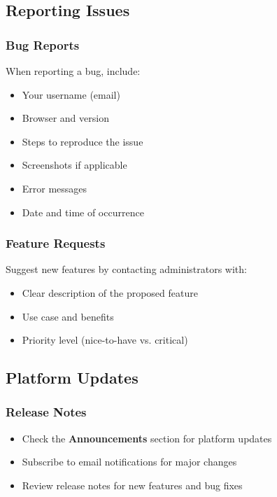 \documentclass[12pt,a4paper]{article}
\begin{document}
\subsection{Reporting Issues}

\subsubsection{Bug Reports}
When reporting a bug, include:
\begin{itemize}[leftmargin=*]
    \item Your username (email)
    \item Browser and version
    \item Steps to reproduce the issue
    \item Screenshots if applicable
    \item Error messages
    \item Date and time of occurrence
\end{itemize}

\subsubsection{Feature Requests}
Suggest new features by contacting administrators with:
\begin{itemize}[leftmargin=*]
    \item Clear description of the proposed feature
    \item Use case and benefits
    \item Priority level (nice-to-have vs. critical)
\end{itemize}

\subsection{Platform Updates}

\subsubsection{Release Notes}
\begin{itemize}[leftmargin=*]
    \item Check the \textbf{Announcements} section for platform updates
    \item Subscribe to email notifications for major changes
    \item Review release notes for new features and bug fixes
\end{itemize}
\end{document}
